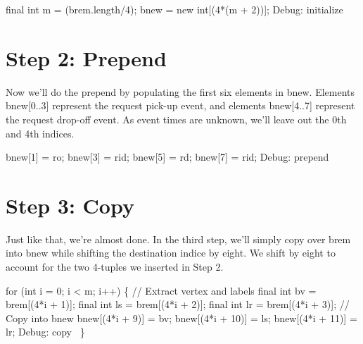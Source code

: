 \nwenddocs{}\endmoddef\nwstartdeflinemarkup{}\nwenddeflinemarkup
final int m = (brem.length/4);
bnew = new int[(4*(m + 2))];
\LA{}Debug: initialize~{\nwtagstyle{}}\RA{}
\nwendcode{}\nwdocspar

\section{Step 2: Prepend}

Now we'll do the prepend by populating the first six elements in {\Tt{}bnew\nwendquote}.
Elements {\Tt{}bnew[0..3]\nwendquote} represent the request pick-up event, and elements
{\Tt{}bnew[4..7]\nwendquote} represent the request drop-off event. As event times are
unknown, we'll leave out the 0th and 4th indices.

\nwenddocs{}\endmoddef\nwstartdeflinemarkup{}\nwenddeflinemarkup
bnew[1] = ro;
bnew[3] = rid;
bnew[5] = rd;
bnew[7] = rid;
\LA{}Debug: prepend~{\nwtagstyle{}}\RA{}
\nwendcode{}\nwdocspar

\section{Step 3: Copy}

Just like that, we're almost done. In the third step, we'll simply copy over
{\Tt{}brem\nwendquote} into {\Tt{}bnew\nwendquote} while shifting the destination indice by eight. We shift
by eight to account for the two 4-tuples we inserted in Step 2.

\nwenddocs{}\endmoddef\nwstartdeflinemarkup{}\nwenddeflinemarkup
for (int i = 0; i < m; i++) \{
  // Extract vertex and labels
  final int bv = brem[(4*i + 1)];
  final int ls = brem[(4*i + 2)];
  final int lr = brem[(4*i + 3)];
  // Copy into bnew
  bnew[(4*i +  9)] = bv;
  bnew[(4*i + 10)] = ls;
  bnew[(4*i + 11)] = lr;
  \LA{}Debug: copy~{\nwtagstyle{}}\RA{}
\}
\nwendcode{}\nwdocspar

